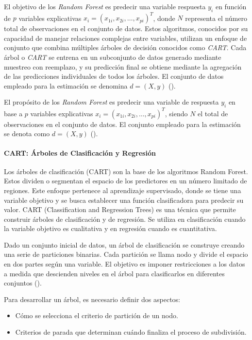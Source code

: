 El objetivo de los \textit{Random Forest} es predecir una variable respuesta \(y_i\) en función de \(p\) variables explicativas \(x_i = (x_{1i}, x_{2i}, \ldots, x_{pi})^T\), donde \(N\) representa el número total de observaciones en el conjunto de datos. Estos algoritmos, conocidos por su capacidad de manejar relaciones complejas entre variables, utilizan un enfoque de conjunto que combina múltiples árboles de decisión conocidos como \textit{CART}. Cada árbol o \textit{CART} se entrena en un subconjunto de datos generado mediante muestreo con reemplazo, y su predicción final se obtiene mediante la agregación de las predicciones individuales de todos los árboles. El conjunto de datos empleado para la estimación se denomina \(d = (X, y)\) (\cite{ho1995random}).

El propósito de los \textit{Random Forest} es predecir una variable de respuesta \(y_i\) en base a \(p\) variables explicativas \(x_i = (x_{1i}, x_{2i}, \ldots, x_{pi})^T\), siendo \(N\) el total de observaciones en el conjunto de datos. El conjunto empleado para la estimación se denota como \(d = (X, y)\) (\cite{ho1995random}).

\paragraph{CART: Árboles de Clasificación y Regresión}
Los árboles de clasificación (CART) son la base de los algoritmos Random Forest. Estos dividen o segmentan el espacio de los predictores en un número limitado de regiones. Este enfoque pertenece al aprendizaje supervisado, donde se tiene una variable objetivo y se busca establecer una función clasificadora para predecir su valor. CART (Classification and Regression Trees) es una técnica que permite construir árboles de clasificación y de regresión. Se utiliza en clasificación cuando la variable objetivo es cualitativa y en regresión cuando es cuantitativa.

Dado un conjunto inicial de datos, un árbol de clasificación se construye creando una serie de particiones binarias. Cada partición se llama nodo y divide el espacio en dos partes según una variable. El objetivo es imponer restricciones a los datos a medida que descienden niveles en el árbol para clasificarlos en diferentes conjuntos (\cite{wu2008top}).

Para desarrollar un árbol, es necesario definir dos aspectos:
\begin{itemize}
	\item Cómo se selecciona el criterio de partición de un nodo.
	\item Criterios de parada que determinan cuándo finaliza el proceso de subdivisión.
\end{itemize}


